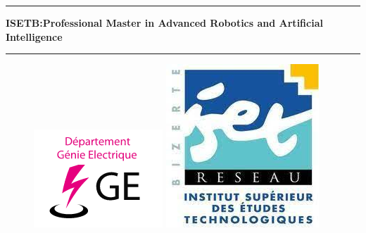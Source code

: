 \documentclass[]{report}   %
\begin{document}
\hrule
\vspace*{1cm}
\centering
\Large \textbf{ISETB:Professional Master in Advanced Robotics and Artificial Intelligence}
\vspace*{1cm}
\hrule

\begin{figure}[h]
    \begin{minipage}[h]{0.2\textwidth}
        \raggedright     %
        \includegraphics[width=\textwidth]{logo.jpg}
    \end{minipage}
    \hspace*{0.6\textwidth}
    \begin{minipage}[h]{0.2\textwidth}
        \raggedleft %
        \includegraphics[width=\textwidth]{logo_iset.jpg}
    \end{minipage}
\end{figure}
\vspace*{2cm}
\end{document}
